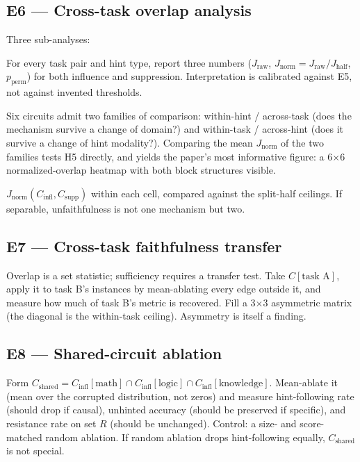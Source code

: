 \documentclass[11pt]{article}
\begin{document}
\subsection*{E6 --- Cross-task overlap analysis}
Three sub-analyses:
\begin{description}[leftmargin=1.5em, itemsep=1pt]
  \item[E6a --- Normalized overlap.] For every task pair and hint type, report three numbers ($J_{\text{raw}}$, $J_{\text{norm}} = J_{\text{raw}}/J_{\text{half}}$, $p_{\text{perm}}$) for both influence and suppression. Interpretation is calibrated against E5, not against invented thresholds.
  \item[E6b --- Two-way decomposition (main figure).] Six circuits admit two families of comparison: within-hint / across-task (does the mechanism survive a change of domain?) and within-task / across-hint (does it survive a change of hint modality?). Comparing the mean $J_{\text{norm}}$ of the two families tests H5 directly, and yields the paper's most informative figure: a 6$\times$6 normalized-overlap heatmap with both block structures visible.
  \item[E6c --- Separability (H3).] $J_{\text{norm}}(C_{\text{infl}}, C_{\text{supp}})$ within each cell, compared against the split-half ceilings. If separable, unfaithfulness is not one mechanism but two.
\end{description}

\subsection*{E7 --- Cross-task faithfulness transfer}
Overlap is a set statistic; sufficiency requires a transfer test. Take $C[\text{task A}]$, apply it to task B's instances by mean-ablating every edge outside it, and measure how much of task B's metric is recovered. Fill a 3$\times$3 asymmetric matrix (the diagonal is the within-task ceiling). Asymmetry is itself a finding.

\subsection*{E8 --- Shared-circuit ablation}
Form $C_{\text{shared}} = C_{\text{infl}}[\text{math}] \cap C_{\text{infl}}[\text{logic}] \cap C_{\text{infl}}[\text{knowledge}]$. Mean-ablate it (mean over the corrupted distribution, not zeros) and measure hint-following rate (should drop if causal), unhinted accuracy (should be preserved if specific), and resistance rate on set $R$ (should be unchanged). Control: a size- and score-matched random ablation. If random ablation drops hint-following equally, $C_{\text{shared}}$ is not special.
\end{document}
